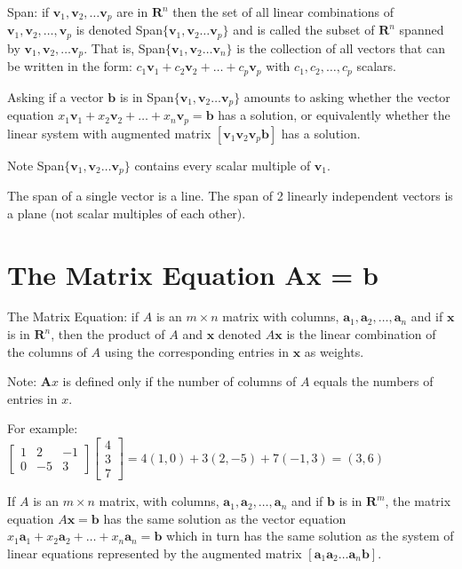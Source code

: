 \documentclass[../linalg.tex]{subfiles}
\begin{document}
Span: if $\textbf{v}_1,\textbf{v}_2,\dots \textbf{v}_p$ are in $\textbf{R}^n$ then the set of all linear combinations of $\textbf{v}_1,\textbf{v}_2,\dots,\textbf{v}_p$ is denoted Span$\{\textbf{v}_1,\textbf{v}_2\dots\textbf{v}_p\}$ and is called the subset of 
$\textbf{R}^n$ spanned by $\textbf{v}_1,\textbf{v}_2,\dots \textbf{v}_p$. That is, Span$\{\textbf{v}_1,\textbf{v}_2\dots\textbf{v}_n\}$ is the collection of all vectors 
that can be written in the form: $c_1\textbf{v}_1+c_2\textbf{v}_2+\dots+c_p\textbf{v}_p$ with $c_1,c_2,\dots,c_p$ scalars.

Asking if a vector $\textbf{b}$ is in Span$\{\textbf{v}_1,\textbf{v}_2\dots\textbf{v}_p\}$ amounts to asking whether the vector equation $x_1\textbf{v}_1+x_2\textbf{v}_2+\dots +x_n\textbf{v}_p=\textbf{b}$ has a solution,
or equivalently whether the linear system with augmented matrix $[\textbf{v}_1 \textbf{v}_2 \textbf{v}_p \textbf{b}]$ has a solution.

Note Span$\{\textbf{v}_1,\textbf{v}_2\dots\textbf{v}_p\}$ contains every scalar multiple of $\textbf{v}_1$. 

The span of a single vector is a line. The span of 2 linearly independent vectors is a plane (not scalar multiples of each other). 

\section{The Matrix Equation Ax = b}
The Matrix Equation: if $A$ is an $m\times n$ matrix with columns, $\textbf{a}_1,\textbf{a}_2,\dots,\textbf{a}_n$ and if $\textbf{x}$ is in $\textbf{R}^n$, then the product of $A$ 
and $\textbf{x}$ denoted $A\textbf{x}$ is the linear combination of the columns of $A$ using the corresponding entries in $\textbf{x}$ as weights.

Note: $\textbf{A}x$ is defined only if the number of columns of $A$ equals the numbers of entries in $x$.

For example: $\begin{bmatrix}
    1 & 2 & -1 \\
    0 & -5 & 3
\end{bmatrix} \begin{bmatrix}
    4 \\ 3 \\ 7
\end{bmatrix} = 4(1,0)+3(2,-5)+7(-1,3)=(3,6)$

\begin{theorem}
    If $A$ is an $m\times n$ matrix, with columns, $\textbf{a}_1,\textbf{a}_2,\dots,\textbf{a}_n$ and if $\textbf{b}$ is in $\textbf{R}^m$, the matrix equation 
    $A\textbf{x}=\textbf{b}$ has the same solution as the vector equation $x_1\textbf{a}_1+x_2\textbf{a}_2+\dots+x_n\textbf{a}_n=\textbf{b}$ which in turn has the same solution 
    as the system of linear equations represented by the augmented matrix $[\textbf{a}_1 \textbf{a}_2\dots \textbf{a}_n \textbf{b}]$.
\end{theorem}
\end{document}
